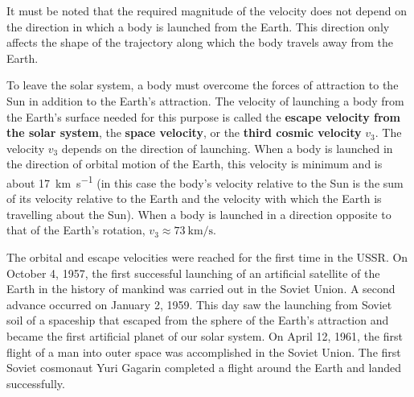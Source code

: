It must be noted that the required magnitude of the velocity does not depend on the direction in which a body is launched from the Earth. This direction only affects the shape of the trajectory along which the body travels away from the Earth.

To leave the solar system, a body must overcome the forces of attraction to the Sun in addition to the Earth's attraction. The velocity of launching a body from the Earth's surface needed for this purpose is called the \textbf{escape velocity from the solar system}, the \textbf{space velocity}, or the \textbf{third cosmic velocity} $v_3$. The velocity $v_3$ depends on the direction of launching. When a body is launched in the direction of orbital motion of the Earth, this velocity is minimum and is about \SI{17}{\kilo\metre\per\second} (in this case the body's velocity relative to the Sun is the sum of its velocity relative to the Earth and the velocity with which the Earth is travelling about the Sun). When a body is launched in a direction opposite to that of the Earth's rotation, $v_3\approx \SI{73}{\kilo\metre\per\second}$.

The orbital and escape velocities were reached for the first time in the USSR. On October 4, 1957, the first successful launching of an artificial satellite of the Earth in the history of mankind was carried out in the Soviet Union. A second advance occurred on January 2, 1959. This day saw the launching from Soviet soil of a spaceship that escaped from the sphere of the Earth's attraction and became the first artificial planet of our solar system. On April 12, 1961, the first flight of a man into outer space was accomplished in the Soviet Union. The first Soviet cosmonaut Yuri Gagarin completed a flight around the Earth and landed successfully.
